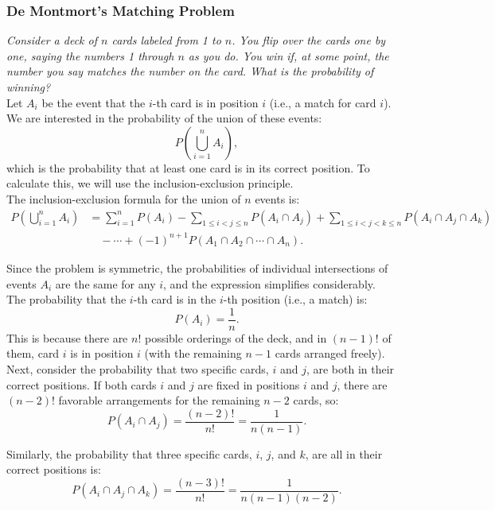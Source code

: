 \subsubsection{De Montmort's Matching Problem}

\textit{Consider a deck of \(n\) cards labeled from 1 to \(n\). You flip over the cards one by one, saying the numbers 1 through \(n\) as you do. You win if, at some point, the number you say matches the number on the card. What is the probability of winning?} \\

Let \(A_i\) be the event that the \(i\)-th card is in position \(i\) (i.e., a match for card \(i\)). We are interested in the probability of the union of these events:
\[
P\left(\bigcup_{i=1}^n A_i\right),
\]
which is the probability that at least one card is in its correct position. To calculate this, we will use the inclusion-exclusion principle. \\

The inclusion-exclusion formula for the union of \(n\) events is:
\begin{align*}
    P\left(\bigcup_{i=1}^n A_i\right) & = \sum_{i=1}^n P(A_i) - \sum_{1 \leq i < j \leq n} P(A_i \cap A_j)  + \sum_{1 \leq i < j < k \leq n} P(A_i \cap A_j \cap A_k) \\
    & \quad - \cdots + (-1)^{n+1} P(A_1 \cap A_2 \cap \cdots \cap A_n).
    \end{align*}
    
Since the problem is symmetric, the probabilities of individual intersections of events \(A_i\) are the same for any \(i\), and the expression simplifies considerably.\\

The probability that the \(i\)-th card is in the \(i\)-th position (i.e., a match) is:
\[
P(A_i) = \frac{1}{n}.
\]
This is because there are \(n!\) possible orderings of the deck, and in \((n-1)!\) of them, card \(i\) is in position \(i\) (with the remaining \(n-1\) cards arranged freely).\\

Next, consider the probability that two specific cards, \(i\) and \(j\), are both in their correct positions. If both cards \(i\) and \(j\) are fixed in positions \(i\) and \(j\), there are \((n-2)!\) favorable arrangements for the remaining \(n-2\) cards, so:
\[
P(A_i \cap A_j) = \frac{(n-2)!}{n!} = \frac{1}{n(n-1)}.
\]

Similarly, the probability that three specific cards, \(i\), \(j\), and \(k\), are all in their correct positions is:
\[
P(A_i \cap A_j \cap A_k) = \frac{(n-3)!}{n!} = \frac{1}{n(n-1)(n-2)}.
\]

